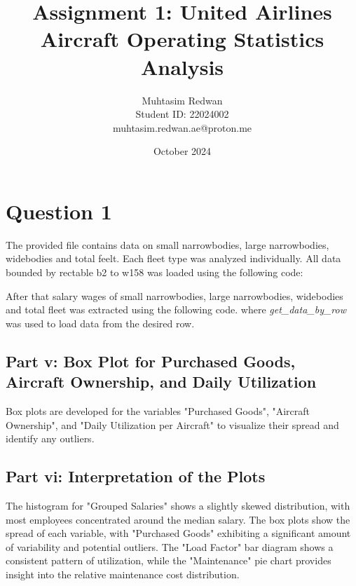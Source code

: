 \documentclass[a4paper,12pt]{article}
\title{Assignment 1: United Airlines Aircraft Operating Statistics Analysis}
\author{Muhtasim Redwan \\ Student ID: 22024002 \\ muhtasim.redwan.ae@proton.me}
\date{October 2024}
\begin{document}
\maketitle




\section{Question 1}
The provided file contains data on small narrowbodies, large narrowbodies, widebodies and total feelt. Each fleet
type was analyzed individually. All data bounded by rectable b2 to w158 was loaded using the following code:


After that salary wages of small narrowbodies, large narrowbodies, widebodies and total fleet was extracted using the following code. where \textit{get\_data\_by\_row} was used to load data from the desired row.






\subsection{Part v: Box Plot for Purchased Goods, Aircraft Ownership, and Daily Utilization}
Box plots are developed for the variables "Purchased Goods", "Aircraft Ownership", and "Daily Utilization per Aircraft" to visualize their spread and identify any outliers.



\subsection{Part vi: Interpretation of the Plots}
The histogram for "Grouped Salaries" shows a slightly skewed distribution, with most employees concentrated around the median salary. The box plots show the spread of each variable, with "Purchased Goods" exhibiting a significant amount of variability and potential outliers. The "Load Factor" bar diagram shows a consistent pattern of utilization, while the "Maintenance" pie chart provides insight into the relative maintenance cost distribution.
\end{document}
